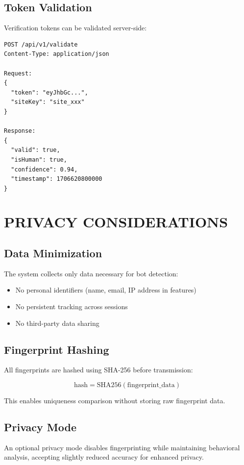 \subsection{Token Validation}

Verification tokens can be validated server-side:

\begin{verbatim}
POST /api/v1/validate
Content-Type: application/json

Request:
{
  "token": "eyJhbGc...",
  "siteKey": "site_xxx"
}

Response:
{
  "valid": true,
  "isHuman": true,
  "confidence": 0.94,
  "timestamp": 1706620800000
}
\end{verbatim}

\section{PRIVACY CONSIDERATIONS}

\subsection{Data Minimization}

The system collects only data necessary for bot detection:
\begin{itemize}
    \item No personal identifiers (name, email, IP address in features)
    \item No persistent tracking across sessions
    \item No third-party data sharing
\end{itemize}

\subsection{Fingerprint Hashing}

All fingerprints are hashed using SHA-256 before transmission:

$$\text{hash} = \text{SHA256}(\text{fingerprint\_data})$$

This enables uniqueness comparison without storing raw fingerprint data.

\subsection{Privacy Mode}

An optional privacy mode disables fingerprinting while maintaining behavioral analysis, accepting slightly reduced accuracy for enhanced privacy.

